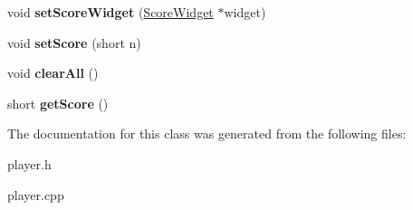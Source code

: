 \begin{DoxyCompactItemize}
\item 
\hypertarget{classPlayer_a3f4657cd0d8f8f62922e67c64cf126d0}{
void {\bfseries setScoreWidget} (\hyperlink{classScoreWidget}{ScoreWidget} $\ast$widget)}
\label{classPlayer_a3f4657cd0d8f8f62922e67c64cf126d0}

\item 
\hypertarget{classPlayer_a5e3f20da8bd397c1776d7cfdd1b571f4}{
void {\bfseries setScore} (short n)}
\label{classPlayer_a5e3f20da8bd397c1776d7cfdd1b571f4}

\item 
\hypertarget{classPlayer_aa6575e6c10f770564b5dac9491648c2a}{
void {\bfseries clearAll} ()}
\label{classPlayer_aa6575e6c10f770564b5dac9491648c2a}

\item 
\hypertarget{classPlayer_a96bab4e2b65baa60c85ef60b31fcb3ce}{
short {\bfseries getScore} ()}
\label{classPlayer_a96bab4e2b65baa60c85ef60b31fcb3ce}

\end{DoxyCompactItemize}


The documentation for this class was generated from the following files:\begin{DoxyCompactItemize}
\item 
player.h\item 
player.cpp\end{DoxyCompactItemize}
